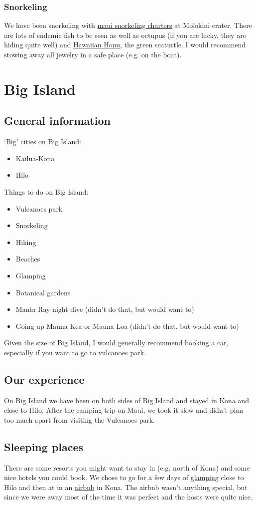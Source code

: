 \documentclass[11pt,a4paper,sans,english]{article}
\begin{document}
\subsubsection{Snorkeling}
We have been snorkeling with \href{https://mauisnorkelcharters.com/}{maui snorkeling charters} at Molokini crater. There are lots of endemic fish to be seen as well as octupus (if you are lucky, they are hiding quite well) and \href{https://www.holualoainn.com/the-hawaiian-honu-symbol-of-wisdom-and-good-luck/}{Hawaiian Honu}, the green seaturtle. I would recommend stowing away all jewelry in a safe place (e.g. on the boat). 

\section{Big Island}
\subsection{General information}
`Big' cities on Big Island:
\begin{itemize}
	\itemsep-0.5em 
	\item Kailua-Kona
	\item Hilo
\end{itemize}
Things to do on Big Island:
\begin{itemize}
	\itemsep-0.5em 
	\item Vulcanoes park
	\item Snorkeling
	\item Hiking
	\item Beaches
	\item Glamping
	\item Botanical gardens
	\item Manta Ray night dive (didn't do that, but would want to)
	\item Going up Mauna Kea or Mauna Loa (didn't do that, but would want to)
\end{itemize}
Given the size of Big Island, I would generally recommend booking a car, especially if you want to go to vulcanoes park.
\subsection{Our experience}
On Big Island we have been on both sides of Big Island and stayed in Kona and close to Hilo. After the camping trip on Maui, we took it slow and didn't plan too much apart from visiting the Vulcanoes park.
\subsection{Sleeping places}
There are some resorts you might want to stay in (e.g. north of Kona) and some nice hotels you could book. We chose to go for a few days of \href{https://www.booking.com/hotel/us/hamakua-house-campign-cabanas.de.html}{glamping} close to Hilo and then at in an \href{https://www.airbnb.ch/trips/v1/ac98664b-0f96-471e-a81e-2f1417b230bb/ro/RESERVATION_USER_CHECKIN/HM5HQT5QFF}{airbnb} in Kona. The airbnb wasn't anything special, but since we were away most of the time it was perfect and the hosts were quite nice. 
\end{document}
